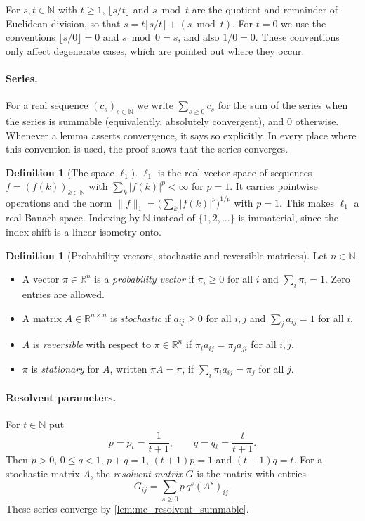 \documentclass[11pt]{article}
\theoremstyle{definition}
\newtheorem{definition}[theorem]{Definition}
\theoremstyle{remark}
\newcommand{\R}{\mathbb{R}}
\newcommand{\N}{\mathbb{N}}
\newcommand{\lnorm}[1]{\lVert #1\rVert_{1}}
\begin{document}
For $s,t\in\N$ with $t\ge1$, $\lfloor s/t\rfloor$ and $s\bmod t$ are the quotient and remainder of Euclidean division, so that $s=t\lfloor s/t\rfloor+(s\bmod t)$. For $t=0$ we use the conventions $\lfloor s/0\rfloor=0$ and $s\bmod 0=s$, and also $1/0=0$. These conventions only affect degenerate cases, which are pointed out where they occur.

\paragraph{Series.}
For a real sequence $(c_s)_{s\in\N}$ we write $\sum_{s\ge0}c_s$ for the sum of the series when the series is summable (equivalently, absolutely convergent), and $0$ otherwise. Whenever a lemma asserts convergence, it says so explicitly. In every place where this convention is used, the proof shows that the series converges.

\begin{definition}[The space $\ell_1$]
$\ell_1$ is the real vector space of sequences $f=(f(k))_{k\in\N}$ with $\sum_k|f(k)|^p<\infty$ for $p=1$. It carries pointwise operations and the norm $\lnorm{f}=\bigl(\sum_k|f(k)|^p\bigr)^{1/p}$ with $p=1$. This makes $\ell_1$ a real Banach space. Indexing by $\N$ instead of $\{1,2,\dots\}$ is immaterial, since the index shift is a linear isometry onto.
\end{definition}

\begin{definition}[Probability vectors, stochastic and reversible matrices]
Let $n\in\N$.
\begin{itemize}
\item A vector $\pi\in\R^n$ is a \emph{probability vector} if $\pi_i\ge0$ for all $i$ and $\sum_i\pi_i=1$. Zero entries are allowed.
\item A matrix $A\in\R^{n\times n}$ is \emph{stochastic} if $a_{ij}\ge0$ for all $i,j$ and $\sum_ja_{ij}=1$ for all $i$.
\item $A$ is \emph{reversible} with respect to $\pi\in\R^n$ if $\pi_ia_{ij}=\pi_ja_{ji}$ for all $i,j$.
\item $\pi$ is \emph{stationary} for $A$, written $\pi A=\pi$, if $\sum_i\pi_ia_{ij}=\pi_j$ for all $j$.
\end{itemize}
\end{definition}

\paragraph{Resolvent parameters.}
For $t\in\N$ put
\[
p=p_t=\frac1{t+1},\qquad q=q_t=\frac t{t+1}.
\]
Then $p>0$, $0\le q<1$, $p+q=1$, $(t+1)p=1$ and $(t+1)q=t$. For a stochastic matrix $A$, the \emph{resolvent matrix} $G$ is the matrix with entries
\[
G_{ij}=\sum_{s\ge0}p\,q^s(A^s)_{ij}.
\]
These series converge by \cref{lem:mc_resolvent_summable}.
\end{document}
